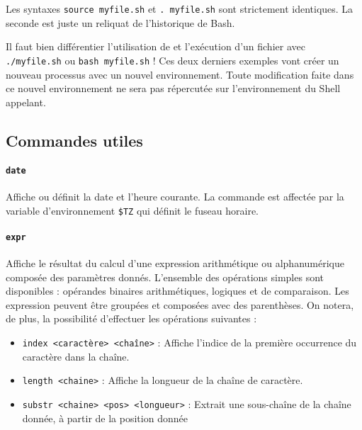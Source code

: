 Les syntaxes \texttt{source myfile.sh} et \texttt{. myfile.sh} sont strictement identiques. La seconde est juste un reliquat de l'historique de Bash.

 Il faut bien différentier l'utilisation de  et l'exécution d'un fichier avec \texttt{./myfile.sh} ou \texttt{bash myfile.sh} ! Ces deux derniers exemples vont créer un nouveau processus avec un nouvel environnement. Toute modification faite dans ce nouvel environnement ne sera pas répercutée sur l'environnement du Shell appelant.

\newpage
\subsection{Commandes utiles}
\vspace{-5mm}

\paragraph{\texttt{date}} 
Affiche ou définit la date et l'heure courante. La commande est affectée par la variable d'environnement \texttt{\$TZ} qui définit le fuseau horaire. 

\paragraph{\texttt{expr}} 
Affiche le résultat du calcul d'une expression arithmétique ou alphanumérique composée des paramètres donnés. L'ensemble des opérations simples sont disponibles : opérandes binaires arithmétiques, logiques et de comparaison. Les expression peuvent être groupées et composées avec des parenthèses. On notera, de plus, la possibilité d'effectuer les opérations suivantes : 
\begin{itemize}
    \item \texttt{index <caractère> <chaîne>} : Affiche l'indice de la première occurrence du caractère dans la chaîne.
    \item \texttt{length <chaine>} : Affiche la longueur de la chaîne de caractère.
    \item \texttt{substr <chaine> <pos> <longueur>} : Extrait une sous-chaîne de la chaîne donnée, à partir de la position donnée
\end{itemize}

